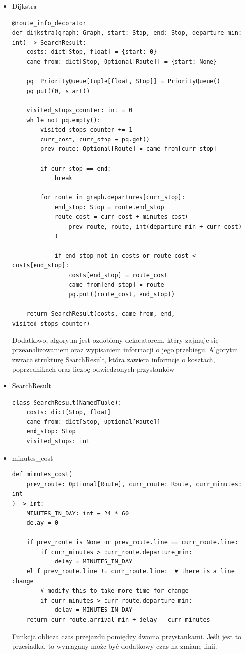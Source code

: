 \documentclass[a4paper, 12pt]{article}
\begin{document}
  \begin{itemize}
    \item Dijkstra
\begin{lstlisting}
@route_info_decorator
def dijkstra(graph: Graph, start: Stop, end: Stop, departure_min: int) -> SearchResult:
    costs: dict[Stop, float] = {start: 0}
    came_from: dict[Stop, Optional[Route]] = {start: None}

    pq: PriorityQueue[tuple[float, Stop]] = PriorityQueue()
    pq.put((0, start))

    visited_stops_counter: int = 0
    while not pq.empty():
        visited_stops_counter += 1
        curr_cost, curr_stop = pq.get()
        prev_route: Optional[Route] = came_from[curr_stop]

        if curr_stop == end:
            break

        for route in graph.departures[curr_stop]:
            end_stop: Stop = route.end_stop
            route_cost = curr_cost + minutes_cost(
                prev_route, route, int(departure_min + curr_cost)
            )

            if end_stop not in costs or route_cost < costs[end_stop]:
                costs[end_stop] = route_cost
                came_from[end_stop] = route
                pq.put((route_cost, end_stop))

    return SearchResult(costs, came_from, end, visited_stops_counter)
\end{lstlisting}
  Dodatkowo, algorytm jest ozdobiony dekoratorem, który zajmuje się 
  przeanalizowaniem oraz wypisaniem informacji o jego przebiegu.
  Algorytm zwraca strukturę SearchResult,
  która zawiera informcje o kosztach, poprzednikach oraz liczbę odwiedzonych przystanków.
  \item SearchResult
\begin{lstlisting}
class SearchResult(NamedTuple):
    costs: dict[Stop, float]
    came_from: dict[Stop, Optional[Route]]
    end_stop: Stop
    visited_stops: int
\end{lstlisting}

  \item minutes\_cost
\begin{lstlisting}
def minutes_cost(
    prev_route: Optional[Route], curr_route: Route, curr_minutes: int
) -> int:
    MINUTES_IN_DAY: int = 24 * 60
    delay = 0

    if prev_route is None or prev_route.line == curr_route.line:
        if curr_minutes > curr_route.departure_min:
            delay = MINUTES_IN_DAY
    elif prev_route.line != curr_route.line:  # there is a line change
        # modify this to take more time for change
        if curr_minutes > curr_route.departure_min:
            delay = MINUTES_IN_DAY
    return curr_route.arrival_min + delay - curr_minutes
\end{lstlisting} 
  Funkcja oblicza czas przejazdu pomiędzy dwoma przystankami. 
  Jeśli jest to przesiadka, to wymagany może być dodatkowy czas na zmianę linii.



  \end{itemize}
  
\end{document}
